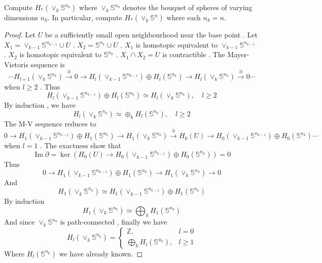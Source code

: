 \documentclass[../main.tex]{subfiles}
\begin{document}
\begin{exercise}{}{}
Compute $H_*(\vee_k \mathbb{S}^{n_k})$ where $\vee_k \mathbb{S}^{n_k}$ denotes the bouquet of spheres of varying dimensions $n_k$. In particular, compute $H_*(\vee_k \mathbb{S}^n)$ where each $n_k = n$.
\end{exercise}

\begin{proof}
 Let \(  U  \) be a sufficiently small open neighbourhood near the base point .      Let \(  X_1=  \vee _{k-1}\mathbb{S}^{n_{k-1}} \cup U  \)    .  \(  X_2=  \mathbb{S}^{n_{k}}\cup U\)   .   \(  X_1  \) is homotopic equivalent to \(  \vee _{k-1}\mathbb{S}^{n_{k-1}}  \) .       \(  X_2  \) is homotopic equivalent to \(  \mathbb{S}^{n_{k}}  \)  . \(  X_1\cap X_2= U  \) is contractible . The Mayer-Vietoris sequence is \[
    \cdots H_{l+ 1}\left( \vee _{k}\mathbb{S}^{n_{k}} \right) \xrightarrow{ \partial }0\to H_{l}\left( \vee _{k-1}\mathbb{S}^{n_{k-1}} \right)\oplus H_{l}\left( \mathbb{S}^{n_{k}} \right)\to  H_{l}\left( \vee _{k}\mathbb{S}^{n_{k}} \right)  \xrightarrow{ \partial } 0\cdots  
    \]  when \( l \ge 2  \) .  Thus \[
    H_{l}\left(  \vee _{k-1}\mathbb{S}^{n_{k-1}}\right)\oplus H_{l}\left( \mathbb{S}^{n_{k}} \right)\simeq  H_{l}\left( \vee _{k}\mathbb{S}^{n_{k}} \right)   ,\quad l\ge 2
    \] By induction , we have \[
 H_{l}\left( \vee _{k}\mathbb{S}^{n_{k}} \right) \simeq \oplus _{k}H_{l}\left( \mathbb{S}^{n_{k}} \right),\quad l\ge  2 
    \] The M-V sequence reduces to \[
     0\to  H_{1}\left( \vee _{k-1}\mathbb{S}^{n_{k-1}} \right)\oplus H_{1}\left( \mathbb{S}^{n_{k}} \right)\to H_{1}\left( \vee _{k}\mathbb{S}^{n_{k}} \right)   \xrightarrow{ \partial }H_0\left( U \right)   \to  H_0\left( \vee _{k-1}\mathbb{S}^{n_{k-1}} \right)\oplus H_{0}\left( \mathbb{S}^{n_{k}} \right)  \cdots    
    \] when \(  l = 1  \) .   The exactness show that \[
    \operatorname{Im} \partial =  \operatorname{ker}\left( H_0\left( U \right)\to H_0\left( \vee _{k-1}\mathbb{S}^{n_{k-1}} \right)\oplus H_0\left( \mathbb{S}^{n_{k}} \right)    \right)= 0 
    \]Thus \[
    0\to H_1\left( \vee _{k-1}\mathbb{S}^{n_{k-1}} \right)\oplus H_1\left( \mathbb{S}^{n_{k}} \right)\to H_1\left( \vee _{k}\mathbb{S}^{n_{k}} \right)\to 0   
    \] And \[
    H_1\left( \vee _{k}\mathbb{S}^{n_{k}} \right) \simeq H_{1}\left( \vee _{k-1}\mathbb{S}^{n_{k-1}} \right)\oplus H_1\left( \mathbb{S}^{n_{k}} \right)   
    \] By induction \[
    H_{1}\left( \vee _{k}\mathbb{S}^{n_{k}} \right)\simeq \bigoplus_{k} H_{1}\left( \mathbb{S}^{n_{k}} \right)  
    \] And since \(  \vee _{k}\mathbb{S}^{n_{k}}  \) is path-connected , finally we have \[
    H_{l}\left( \vee _{k}\mathbb{S}^{n_{k}} \right)= \begin{cases} \mathbb{Z} , & l = 0\\ 
     \bigoplus _{k}H_{l}\left( \mathbb{S}^{n_{k}} \right),&  l\ge 1  \end{cases}  
    \] Where \(  H_{l}\left( \mathbb{S}^{n_{k}} \right)   \) we have already known. 
\end{proof}
\end{document}

